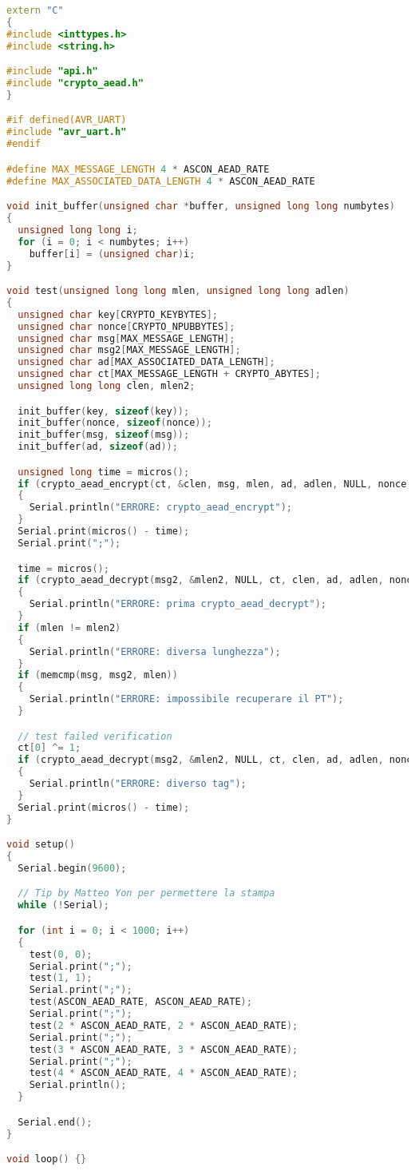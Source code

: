 \documentclass{report}
\begin{document}
\begin{lstlisting}[language=C++]
extern "C"
{
#include <inttypes.h>
#include <string.h>

#include "api.h"
#include "crypto_aead.h"
}

#if defined(AVR_UART)
#include "avr_uart.h"
#endif

#define MAX_MESSAGE_LENGTH 4 * ASCON_AEAD_RATE
#define MAX_ASSOCIATED_DATA_LENGTH 4 * ASCON_AEAD_RATE

void init_buffer(unsigned char *buffer, unsigned long long numbytes)
{
  unsigned long long i;
  for (i = 0; i < numbytes; i++)
    buffer[i] = (unsigned char)i;
}

void test(unsigned long long mlen, unsigned long long adlen)
{
  unsigned char key[CRYPTO_KEYBYTES];
  unsigned char nonce[CRYPTO_NPUBBYTES];
  unsigned char msg[MAX_MESSAGE_LENGTH];
  unsigned char msg2[MAX_MESSAGE_LENGTH];
  unsigned char ad[MAX_ASSOCIATED_DATA_LENGTH];
  unsigned char ct[MAX_MESSAGE_LENGTH + CRYPTO_ABYTES];
  unsigned long long clen, mlen2;

  init_buffer(key, sizeof(key));
  init_buffer(nonce, sizeof(nonce));
  init_buffer(msg, sizeof(msg));
  init_buffer(ad, sizeof(ad));

  unsigned long time = micros();
  if (crypto_aead_encrypt(ct, &clen, msg, mlen, ad, adlen, NULL, nonce, key) != 0)
  {
    Serial.println("ERRORE: crypto_aead_encrypt");
  }
  Serial.print(micros() - time);
  Serial.print(";");

  time = micros();
  if (crypto_aead_decrypt(msg2, &mlen2, NULL, ct, clen, ad, adlen, nonce, key) != 0)
  {
    Serial.println("ERRORE: prima crypto_aead_decrypt");
  }
  if (mlen != mlen2)
  {
    Serial.println("ERRORE: diversa lunghezza");
  }
  if (memcmp(msg, msg2, mlen))
  {
    Serial.println("ERRORE: impossibile recuperare il PT");
  }

  // test failed verification
  ct[0] ^= 1;
  if (crypto_aead_decrypt(msg2, &mlen2, NULL, ct, clen, ad, adlen, nonce, key) == 0)
  {
    Serial.println("ERRORE: diverso tag");
  }
  Serial.print(micros() - time);
}

void setup()
{
  Serial.begin(9600);

  // Tip by Matteo Yon per permettere la stampa
  while (!Serial);

  for (int i = 0; i < 1000; i++)
  {
    test(0, 0);
    Serial.print(";");
    test(1, 1);
    Serial.print(";");
    test(ASCON_AEAD_RATE, ASCON_AEAD_RATE);
    Serial.print(";");
    test(2 * ASCON_AEAD_RATE, 2 * ASCON_AEAD_RATE);
    Serial.print(";");
    test(3 * ASCON_AEAD_RATE, 3 * ASCON_AEAD_RATE);
    Serial.print(";");
    test(4 * ASCON_AEAD_RATE, 4 * ASCON_AEAD_RATE);
    Serial.println();
  }

  Serial.end();
}

void loop() {}
\end{lstlisting}
\end{document}
